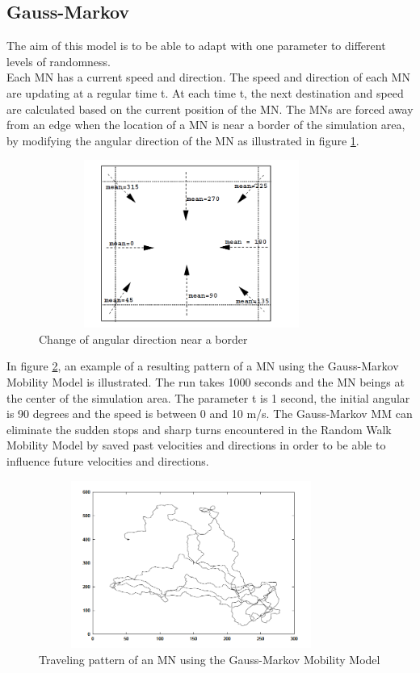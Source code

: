 \newpage

\subsection{Gauss-Markov}

The aim of this model is to be able to adapt with one parameter to different levels of randomness.\\
Each MN has a current speed and direction. The speed and direction of each MN are updating at a regular time t. At each time t, the next destination and speed are calculated based on the current position of the MN. The MNs are forced away from an edge when the location of a MN is near a border of the simulation area, by modifying the angular direction of the MN as illustrated in figure \ref{Gauss-MarkovFig1}.\\

\begin{figure}[h]
\center
\includegraphics[width=10cm,height=55mm]{../images/gauss-markovmodel1.png}
\caption{\label{Gauss-MarkovFig1} Change of angular direction near a border\cite{SurveyMobilityModelsAdHoc1}}
\end{figure}

In figure \ref{Gauss-MarkovFig2}, an example of a resulting pattern of a MN using the Gauss-Markov Mobility Model is illustrated. The run takes 1000 seconds and the MN beings at the center of the simulation area. The parameter t is 1 second, the initial angular is 90 degrees and the speed is between 0 and 10 m/s. The Gauss-Markov MM can eliminate the sudden stops and sharp turns encountered in the Random Walk Mobility Model by saved past velocities and directions in order to be able to influence future velocities and directions.\\

\begin{figure}[h]
\center
\includegraphics[width=10cm,height=55mm]{../images/gauss-markovmodel2.png}
\caption{\label{Gauss-MarkovFig2} Traveling pattern of an MN using the Gauss-Markov Mobility Model\cite{SurveyMobilityModelsAdHoc1}}
\end{figure}

